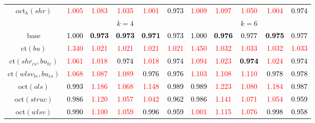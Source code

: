 \begin{tabular}[t]{c|>{}cccc>{}c|ccccc}
oct$_h(shr)$ & \textcolor{red}{1.005} & \textcolor{red}{1.083} & \textcolor{red}{1.035} & \textcolor{red}{1.001} & \textcolor{black}{0.973} & \textcolor{red}{1.009} & \textcolor{red}{1.097} & \textcolor{red}{1.050} & \textcolor{red}{1.004} & \textcolor{black}{0.974}\\
\addlinespace[0.3em]
\multicolumn{1}{c}{} & \multicolumn{5}{c}{\textbf{$k = 4$}} & \multicolumn{5}{c}{\textbf{$k = 6$}}\\
base & \textcolor{black}{1.000} & \textcolor{black}{\textbf{0.973}} & \textcolor{black}{\textbf{0.973}} & \textcolor{black}{\textbf{0.971}} & \textcolor{black}{0.973} & \textcolor{black}{1.000} & \textcolor{black}{\textbf{0.976}} & \textcolor{black}{0.977} & \textcolor{black}{\textbf{0.975}} & \textcolor{black}{0.977}\\
ct$(bu)$ & \textcolor{red}{1.340} & \textcolor{red}{1.021} & \textcolor{red}{1.021} & \textcolor{red}{1.021} & \textcolor{red}{1.021} & \textcolor{red}{1.450} & \textcolor{red}{1.032} & \textcolor{red}{1.033} & \textcolor{red}{1.032} & \textcolor{red}{1.033}\\
ct$(shr_{cs}, bu_{te})$ & \textcolor{red}{1.061} & \textcolor{red}{1.018} & \textcolor{black}{0.974} & \textcolor{red}{1.018} & \textcolor{black}{0.974} & \textcolor{red}{1.094} & \textcolor{red}{1.023} & \textcolor{black}{\textbf{0.974}} & \textcolor{red}{1.024} & \textcolor{black}{0.974}\\
ct$(wlsv_{te}, bu_{cs})$ & \textcolor{red}{1.068} & \textcolor{red}{1.087} & \textcolor{red}{1.089} & \textcolor{black}{0.976} & \textcolor{black}{0.976} & \textcolor{red}{1.103} & \textcolor{red}{1.108} & \textcolor{red}{1.110} & \textcolor{black}{0.978} & \textcolor{black}{0.978}\\
oct$(ols)$ & \textcolor{black}{0.993} & \textcolor{red}{1.186} & \textcolor{red}{1.068} & \textcolor{red}{1.148} & \textcolor{black}{0.989} & \textcolor{black}{0.989} & \textcolor{red}{1.223} & \textcolor{red}{1.080} & \textcolor{red}{1.184} & \textcolor{black}{0.987}\\
oct$(struc)$ & \textcolor{black}{0.986} & \textcolor{red}{1.120} & \textcolor{red}{1.057} & \textcolor{red}{1.042} & \textcolor{black}{0.962} & \textcolor{black}{0.986} & \textcolor{red}{1.141} & \textcolor{red}{1.071} & \textcolor{red}{1.054} & \textcolor{black}{0.959}\\
oct$(wlsv)$ & \textcolor{black}{0.990} & \textcolor{red}{1.100} & \textcolor{red}{1.059} & \textcolor{black}{0.996} & \textcolor{black}{0.959} & \textcolor{red}{1.001} & \textcolor{red}{1.115} & \textcolor{red}{1.076} & \textcolor{black}{0.998} & \textcolor{black}{0.958}\\

\end{tabular}
